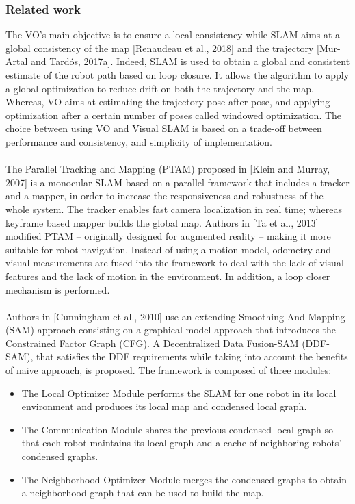 \documentclass[11pt,openany]{book}
\begin{document}
\subsubsection{Related work}
The VO’s main objective is to ensure a local consistency while SLAM aims at a global consistency of the map [Renaudeau et al., 2018] and the trajectory [Mur-Artal and Tardós, 2017a]. Indeed, SLAM is used to obtain a global and consistent estimate of the robot path based on loop closure. It allows the algorithm to apply a global optimization to reduce drift on both the trajectory and the map. Whereas, VO aims at estimating the trajectory pose after pose, and applying optimization after a certain number of poses called windowed optimization. The choice between using VO and Visual SLAM is based on a trade-oﬀ between performance and consistency, and simplicity of implementation.\\\\
The Parallel Tracking and Mapping (PTAM) proposed in [Klein and Murray, 2007] is a monocular SLAM based on a parallel framework that includes a tracker and a mapper, in order to increase the responsiveness and robustness of the whole system. The tracker enables fast camera localization in real time; whereas keyframe based mapper builds the global map. Authors in [Ta et al., 2013] modiﬁed PTAM – originally designed for augmented reality – making it more suitable for robot navigation. Instead of using a motion model, odometry and visual measurements are fused into the framework to deal with the lack of visual features and the lack of motion in the environment. In addition, a loop closer mechanism is performed.\\\\
Authors in [Cunningham et al., 2010] use an extending Smoothing And Mapping (SAM) approach consisting on a graphical model approach that introduces the Constrained Factor Graph (CFG). A Decentralized Data Fusion-SAM (DDF-SAM), that satisﬁes the DDF requirements while taking into account the beneﬁts of naive approach, is proposed. The framework is composed of three modules:
\begin{itemize}
    \item The Local Optimizer Module performs the SLAM for one robot in its local environment and produces its local map and condensed local graph.
    \item The Communication Module shares the previous condensed local graph so that each robot maintains its local graph and a cache of neighboring robots’ condensed graphs.
    \item The Neighborhood Optimizer Module merges the condensed graphs to obtain a neighborhood graph that can be used to build the map.
\end{itemize}
\end{document}

